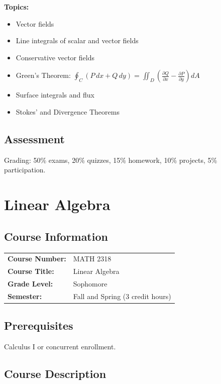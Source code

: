 \documentclass[12pt,oneside]{book}
\begin{document}
\textbf{Topics:}
\begin{itemize}
    \item Vector fields
    \item Line integrals of scalar and vector fields
    \item Conservative vector fields
    \item Green's Theorem: $\oint_C (P \, dx + Q \, dy) = \iint_D \left(\frac{\partial Q}{\partial x} - \frac{\partial P}{\partial y}\right) dA$
    \item Surface integrals and flux
    \item Stokes' and Divergence Theorems
\end{itemize}

\section{Assessment}

Grading: 50\% exams, 20\% quizzes, 15\% homework, 10\% projects, 5\% participation.


\chapter{Linear Algebra}

\section{Course Information}

\begin{tabular}{ll}
\textbf{Course Number:} & MATH 2318 \\
\textbf{Course Title:} & Linear Algebra \\
\textbf{Grade Level:} & Sophomore \\
\textbf{Semester:} & Fall and Spring (3 credit hours) \\
\end{tabular}

\section{Prerequisites}

Calculus I or concurrent enrollment.

\section{Course Description}
\end{document}
